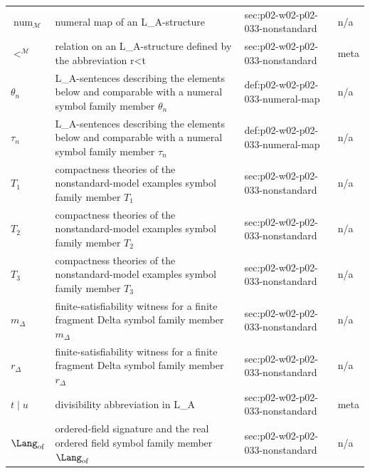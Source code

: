\begin{longtable}{@{}p{}p{}p{}p{}@{}}
\(\operatorname{num}_{\mathcal M}\) & numeral map of an L\_A-structure & sec:\allowbreak{}p02-\allowbreak{}w02-\allowbreak{}p02-\allowbreak{}033-\allowbreak{}nonstandard & n/a \\
\(<^{\mathcal M}\) & relation on an L\_A-structure defined by the abbreviation r<t & sec:\allowbreak{}p02-\allowbreak{}w02-\allowbreak{}p02-\allowbreak{}033-\allowbreak{}nonstandard & meta \\
\(\theta_n\) & L\_A-sentences describing the elements below and comparable with a numeral symbol family member \(\theta_n\) & def:\allowbreak{}p02-\allowbreak{}w02-\allowbreak{}p02-\allowbreak{}033-\allowbreak{}numeral-\allowbreak{}map & n/a \\
\(\tau_n\) & L\_A-sentences describing the elements below and comparable with a numeral symbol family member \(\tau_n\) & def:\allowbreak{}p02-\allowbreak{}w02-\allowbreak{}p02-\allowbreak{}033-\allowbreak{}numeral-\allowbreak{}map & n/a \\
\(T_1\) & compactness theories of the nonstandard-model examples symbol family member \(T_1\) & sec:\allowbreak{}p02-\allowbreak{}w02-\allowbreak{}p02-\allowbreak{}033-\allowbreak{}nonstandard & n/a \\
\(T_2\) & compactness theories of the nonstandard-model examples symbol family member \(T_2\) & sec:\allowbreak{}p02-\allowbreak{}w02-\allowbreak{}p02-\allowbreak{}033-\allowbreak{}nonstandard & n/a \\
\(T_3\) & compactness theories of the nonstandard-model examples symbol family member \(T_3\) & sec:\allowbreak{}p02-\allowbreak{}w02-\allowbreak{}p02-\allowbreak{}033-\allowbreak{}nonstandard & n/a \\
\(m_\Delta\) & finite-satisfiability witness for a finite fragment Delta symbol family member \(m_\Delta\) & sec:\allowbreak{}p02-\allowbreak{}w02-\allowbreak{}p02-\allowbreak{}033-\allowbreak{}nonstandard & n/a \\
\(r_\Delta\) & finite-satisfiability witness for a finite fragment Delta symbol family member \(r_\Delta\) & sec:\allowbreak{}p02-\allowbreak{}w02-\allowbreak{}p02-\allowbreak{}033-\allowbreak{}nonstandard & n/a \\
\(t\mid u\) & divisibility abbreviation in L\_A & sec:\allowbreak{}p02-\allowbreak{}w02-\allowbreak{}p02-\allowbreak{}033-\allowbreak{}nonstandard & meta \\
\(\Lang_{\mathrm{of}}\) & ordered-field signature and the real ordered field symbol family member \(\Lang_{\mathrm{of}}\) & sec:\allowbreak{}p02-\allowbreak{}w02-\allowbreak{}p02-\allowbreak{}033-\allowbreak{}nonstandard & n/a \\

\end{longtable}
